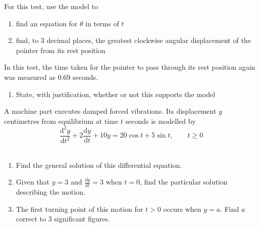 \documentclass[leqno]{article}
\begin{document}
\begin{enumerate}[
  label=\textbf{\arabic*.},
  leftmargin=*,
  topsep=0pt,
  partopsep=0pt,
  parsep=0pt
]
For this test, use the model to
\begin{enumerate}[label=\textbf{(\alph*)}]
  \item find an equation for $\theta$ in terms of $t$  \\
  \item find, to $3$ decimal places, the greatest clockwise angular displacement of the pointer from its rest position  \\
\end{enumerate}
In this test, the time taken for the pointer to pass through its rest position again was measured as $0.69$ seconds. \\
\begin{enumerate}[label=\textbf{(\alph*)}, resume]
  \item State, with justification, whether or not this supports the model  \\
\end{enumerate}

\newpage

\questionitem

A machine part executes damped forced vibrations. Its displacement $y$ centimetres from equilibrium at time $t$ seconds is modelled by \\
\[
\frac{\mathrm{d}^2 y}{\mathrm{d}t^2}+2\frac{\mathrm{d}y}{\mathrm{d}t}+10y=20\cos t+5\sin t,\qquad t\ge 0
\] \\
\begin{enumerate}[label=\textbf{(\alph*)}]
  \item Find the general solution of this differential equation.  \\
  \item Given that $y=3$ and $\frac{\mathrm{d}y}{\mathrm{d}t}=3$ when $t=0$, find the particular solution describing the motion.  \\
  \item The first turning point of this motion for $t>0$ occurs when $y=a$. Find $a$ correct to $3$ significant figures.  \\
\end{enumerate}

\newpage

\questionitem

\begin{figure}[H]
    \centering
{}
\end{figure}
\end{enumerate}
\end{document}
